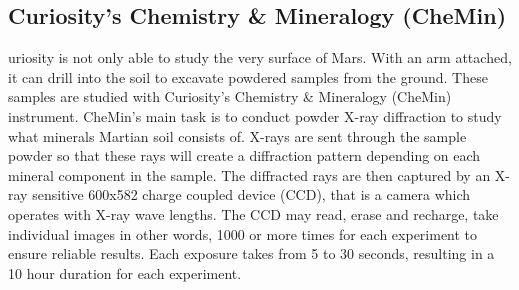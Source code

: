 \subsection{Curiosity's Chemistry \& Mineralogy (CheMin)}
uriosity is not only able to study the very surface of Mars.
With an arm attached, it can drill into the soil to excavate powdered samples from the ground.
These samples are studied with Curiosity's Chemistry \& Mineralogy (CheMin) instrument.
CheMin's main task is to conduct powder X-ray diffraction to study what minerals Martian soil consists of.
X-rays are sent through the sample powder so that these rays will create a diffraction pattern depending on each mineral component in the sample.
The diffracted rays are then captured by an X-ray sensitive 600x582 charge coupled device (CCD), that is a camera which operates with X-ray wave lengths.
The CCD may read, erase and recharge, take individual images in other words, 1000 or more times for each experiment to ensure reliable results.
Each exposure takes from 5 to 30 seconds, resulting in a 10 hour duration for each experiment. \cite{CheMin}